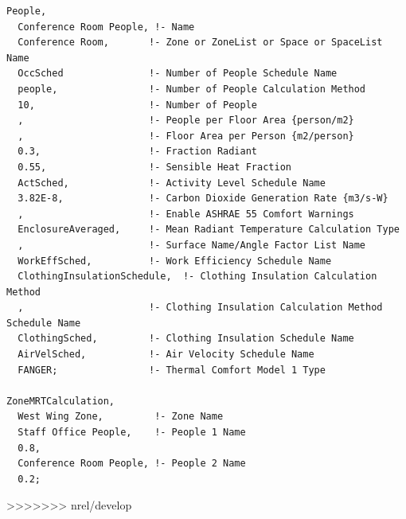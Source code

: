 \begin{lstlisting}
People,
  Conference Room People, !- Name
  Conference Room,       !- Zone or ZoneList or Space or SpaceList Name
  OccSched               !- Number of People Schedule Name
  people,                !- Number of People Calculation Method
  10,                    !- Number of People
  ,                      !- People per Floor Area {person/m2}
  ,                      !- Floor Area per Person {m2/person}
  0.3,                   !- Fraction Radiant
  0.55,                  !- Sensible Heat Fraction
  ActSched,              !- Activity Level Schedule Name
  3.82E-8,               !- Carbon Dioxide Generation Rate {m3/s-W}
  ,                      !- Enable ASHRAE 55 Comfort Warnings
  EnclosureAveraged,     !- Mean Radiant Temperature Calculation Type
  ,                      !- Surface Name/Angle Factor List Name
  WorkEffSched,          !- Work Efficiency Schedule Name
  ClothingInsulationSchedule,  !- Clothing Insulation Calculation Method
  ,                      !- Clothing Insulation Calculation Method Schedule Name
  ClothingSched,         !- Clothing Insulation Schedule Name
  AirVelSched,           !- Air Velocity Schedule Name
  FANGER;                !- Thermal Comfort Model 1 Type

ZoneMRTCalculation,
  West Wing Zone,         !- Zone Name
  Staff Office People,    !- People 1 Name
  0.8,
  Conference Room People, !- People 2 Name
  0.2;
\end{lstlisting}
>>>>>>> nrel/develop
